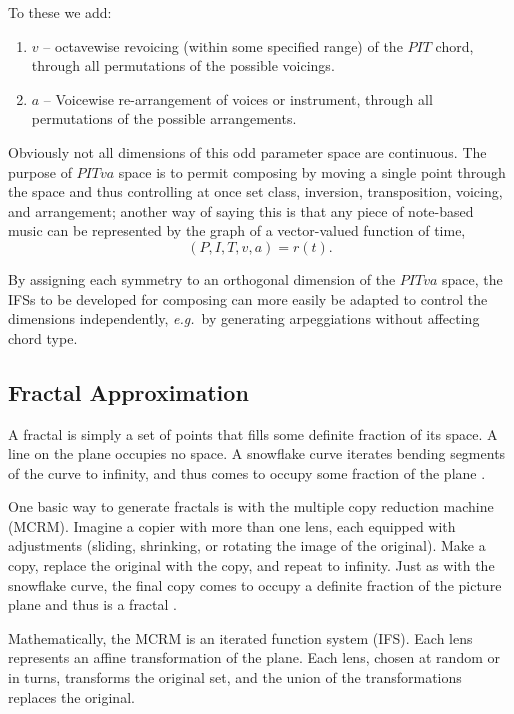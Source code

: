 \documentclass[english,11pt,letterpaper,onecolumn]{scrartcl}
\numberwithin{equation}{section}
\begin{document}
    \noindent To these we add:
    
    \begin{enumerate}[resume]
        \item $v$ -- octavewise revoicing (within some specified range) of the 
        $PIT$ chord, through all permutations of the possible voicings.
        \item $a$ -- Voicewise re-arrangement of voices or instrument, through 
all
        permutations of the possible arrangements.
    \end{enumerate}
    
    \noindent Obviously not all dimensions of this odd parameter space are 
    continuous. The purpose of $PITva$ space is to permit composing by moving 
a 
    single point through the space and thus controlling at once set class, 
    inversion, transposition, voicing, and arrangement; another way of saying 
this 
    is that any piece of note-based music can be represented by the 
    graph of a vector-valued function of time, $$(P, I, T, v, a) = 
    r(t).$$
    
    By assigning each symmetry to an orthogonal dimension of the $PITva$ space, 
the 
    IFSs to be developed for composing can more easily be adapted to control 
the 
    dimensions independently, \textit{e.g.}\ by generating arpeggiations 
without 
    affecting chord type.
    
    \subsection{Fractal Approximation}
    
    A fractal is simply a set of points that fills some definite fraction of 
its 
    space. A line on the plane occupies no space. A snowflake curve iterates 
    bending segments of the curve to infinity, and thus comes to occupy some 
    fraction of the plane \cite{Mandelbrot:1982:FGN}.
    
    One basic way to generate fractals is with the multiple copy reduction 
    machine (MCRM). Imagine a copier with more than one lens, each equipped 
with 
    adjustments (sliding, shrinking, or rotating the image of the original). 
Make 
    a copy, replace the original with the copy, and repeat to infinity. Just 
as 
    with the snowflake curve, the final copy comes to occupy a definite 
fraction 
    of the picture plane and thus is a fractal \cite{chaosandfractals}. 
    
    Mathematically, the MCRM is an iterated function system (IFS). Each lens 
    represents an affine transformation of the plane. Each lens, chosen at 
random 
    or in turns, transforms the original set, and the union of the 
transformations  
    replaces the original.
    
\end{document}
